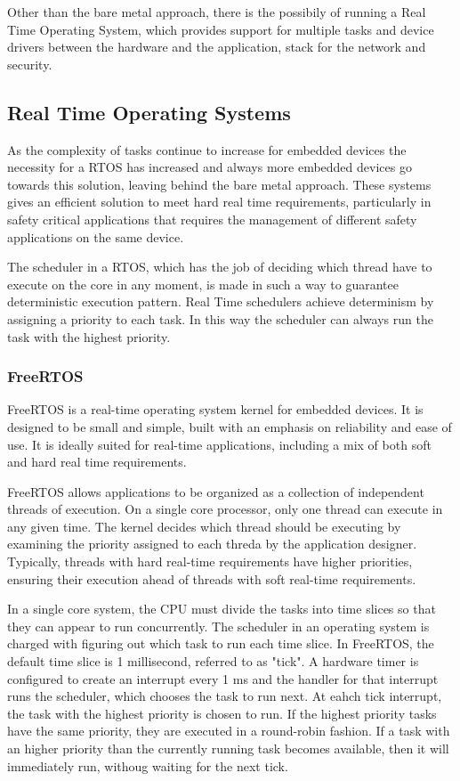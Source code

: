 Other than the bare metal approach, there is the possibily of running a Real
Time Operating System, which provides support for multiple tasks and
device drivers between the hardware and the application, stack for the network
and security.

\subsection{Real Time Operating Systems}

As the complexity of tasks continue to increase for embedded devices the
necessity for a RTOS has increased and always more embedded devices go towards
this solution, leaving behind the bare metal approach.
These systems gives an efficient solution to meet hard real time requirements,
particularly in safety critical applications that requires the management of
different safety applications on the same device.

The scheduler in a RTOS, which has the job of deciding which thread have to
execute on the core in any moment, is made in such a way to guarantee 
deterministic execution pattern. Real Time schedulers achieve determinism by
assigning a priority to each task. In this way the scheduler can always run the
task with the highest priority. \cite{freeRTOS}

\subsubsection{FreeRTOS}

FreeRTOS is a real-time operating system kernel for embedded devices. It is
designed to be small and simple, built with an emphasis on reliability and
ease of use.
It is ideally suited for real-time applications, including a mix of both
soft and hard real time requirements.

FreeRTOS allows applications to be organized as a collection of independent
threads of execution. On a single core processor, only one thread can execute
in any given time. The kernel decides which thread should be executing by
examining the priority assigned to each threda by the application designer.
Typically, threads with hard real-time requirements have higher priorities,
ensuring their execution ahead of threads with soft real-time requirements.

In a single core system, the CPU must divide the tasks into time slices so that
they can appear to run concurrently. The scheduler in an operating system is
charged with figuring out which task to run each time slice.
In FreeRTOS, the default time slice is 1 millisecond, referred to as "tick". 
A hardware timer is configured to create an interrupt every 1 ms and
the handler for that interrupt runs the scheduler, which chooses the task to
run next.
At eahch tick interrupt, the task with the highest priority is chosen to run.
If the highest priority tasks have the same priority, they are executed in a
round-robin fashion. If a task with an higher priority than the currently
running task becomes available, then it will immediately run, withoug waiting 
for the next tick.


